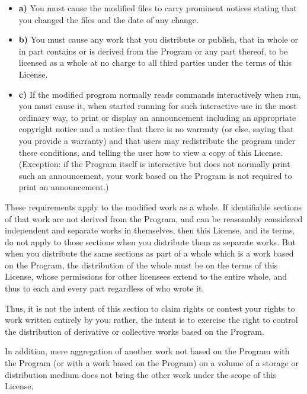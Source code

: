 \begin{itemize}
\item {\bf a)} You must cause the modified files to carry prominent  notices
   stating that you changed the files and the date of any change.

\item {\bf b)} You must cause any work that you distribute or  publish, that
   in whole or in part contains or is derived from the Program or  any part
   thereof, to be licensed as a whole at no charge to all third parties  under
   the terms of this License.

\item {\bf c)} If the modified program normally reads commands  interactively
   when run, you must cause it, when started running for such  interactive use in
   the most ordinary way, to print or display an announcement  including an
   appropriate copyright notice and a notice that there is no  warranty (or else,
   saying that you provide a warranty) and that users may  redistribute the
   program under these conditions, and telling the user how to  view a copy of
   this License. (Exception: if the Program itself is interactive  but does not
   normally print such an announcement, your work based on the  Program is not
   required to print an announcement.)
\end{itemize}

These requirements apply to the modified work as a whole. If identifiable
sections of that work are not derived from the Program, and can be reasonably
considered independent and separate works in themselves, then this License,
and its terms, do not apply to those sections when you distribute them as
separate works. But when you distribute the same sections as part of a whole
which is a work based on the Program, the distribution of the whole must be on
the terms of this License, whose permissions for other licensees extend to the
entire whole, and thus to each and every part regardless of who wrote it.

Thus, it is not the intent of this section to claim rights or contest your
rights to work written entirely by you; rather, the intent is to exercise the
right to control the distribution of derivative or collective works based on
the Program.

In addition, mere aggregation of another work not based on the Program with
the Program (or with a work based on the Program) on a volume of a storage or
distribution medium does not bring the other work under the scope of this
License.

